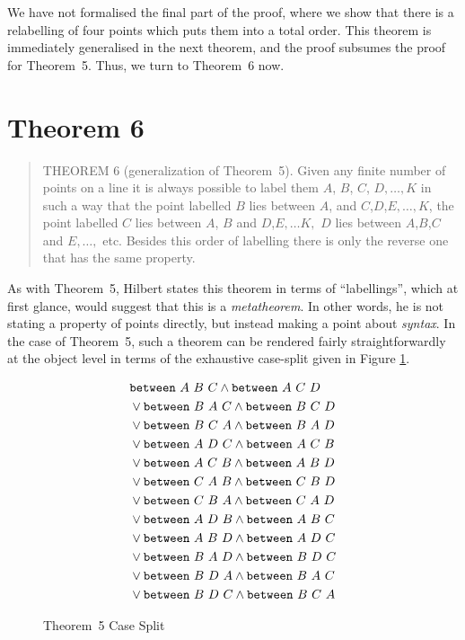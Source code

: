 We have not formalised the final part of the proof, where we show that there is a relabelling of four points which puts them into a total order. This theorem is immediately generalised in the next theorem, and the proof subsumes the proof for Theorem~5. Thus, we turn to Theorem~6 now.

\section{Theorem 6}\label{sec:Theorem6}
\begin{quote}THEOREM 6 (generalization of Theorem~5). Given any finite number of points on a line it is always possible to label them $A$, $B$, $C$, $D, \ldots, K$ in such a way that the point labelled $B$ lies between $A$, and $C$,$D$,$E, \ldots, K$, the point labelled $C$ lies between $A$, $B$ and $D$,$E,\ldots K,$ $D$ lies between $A$,$B$,$C$ and $E, \ldots,$ etc. Besides this order of labelling there is only the reverse one that has the same property.
\end{quote}
As with Theorem~5, Hilbert states this theorem in terms of ``labellings'', which at first glance, would suggest that this is a \emph{metatheorem}. In other words, he is not stating a property of points directly, but instead making a point about \emph{syntax}. In the case of Theorem~5, such a theorem can be rendered fairly straightforwardly at the object level in terms of the exhaustive case-split given in Figure \ref{fig:Theorem5CasesFormalised}.

\begin{figure}
  \begin{align*}
    &\texttt{between}\ A\ B\ C\wedge\texttt{between}\ A\ C\ D\\
    &\vee\texttt{between}\ B\ A\ C\wedge\texttt{between}\ B\ C\ D\\
    &\vee\texttt{between}\ B\ C\ A\wedge\texttt{between}\ B\ A\ D\\
    &\vee\texttt{between}\ A\ D\ C\wedge\texttt{between}\ A\ C\ B\\
    &\vee\texttt{between}\ A\ C\ B\wedge\texttt{between}\ A\ B\ D\\
    &\vee\texttt{between}\ C\ A\ B\wedge\texttt{between}\ C\ B\ D\\
    &\vee\texttt{between}\ C\ B\ A\wedge\texttt{between}\ C\ A\ D\\
    &\vee\texttt{between}\ A\ D\ B\wedge\texttt{between}\ A\ B\ C\\
    &\vee\texttt{between}\ A\ B\ D\wedge\texttt{between}\ A\ D\ C\\
    &\vee\texttt{between}\ B\ A\ D\wedge\texttt{between}\ B\ D\ C\\
    &\vee\texttt{between}\ B\ D\ A\wedge\texttt{between}\ B\ A\ C\\
    &\vee\texttt{between}\ B\ D\ C\wedge\texttt{between}\ B\ C\ A
  \end{align*}
\caption{Theorem~5 Case Split}
\label{fig:Theorem5CasesFormalised}
\end{figure}

